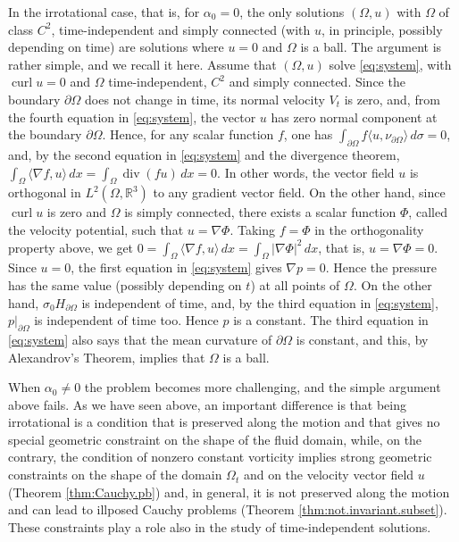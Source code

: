 \documentclass[10pt,reqno,a4paper]{article}
\numberwithin{equation}{section}
\theoremstyle{plain}
\theoremstyle{definition}
\newcommand{\R}{{\mathbb R}}
\newcommand{\Om}{\Omega}
\newcommand{\la}{\langle}
\newcommand{\ra}{\rangle}
\newcommand{\pa}{\partial}
\renewcommand{\div}{\operatorname{div}} %
\newcommand{\grad}{\nabla}
\newcommand{\curl}{\operatorname{curl}}
\begin{document}
In the irrotational case, that is, for $\alpha_0=0$, %
the only solutions $(\Om, u)$ with $\Omega$ of class $C^2$, time-independent and simply connected
(with $u$, in principle, possibly depending on time) 
are solutions where 
$u = 0$ and $\Om$ is a ball. 
The argument is rather simple, and we recall it here.
Assume that $(\Om,u)$ solve \eqref{eq:system}, with $\curl u = 0$ 
and $\Om$ time-independent, $C^2$ and simply connected.
Since the boundary $\pa \Om$ does not change in time, 
its normal velocity $V_t$ is zero, and, from the fourth equation in \eqref{eq:system}, 
the vector $u$ has zero normal component at the boundary $\pa \Om$. 
Hence, for any scalar function $f$, one has 
$\int_{\pa \Om} f \la u , \nu_{\pa \Om} \ra \, d\sigma = 0$, 
and, by the second equation in \eqref{eq:system} and the divergence theorem, 
$\int_\Om \la \grad f, u \ra \, dx = \int_\Om \div(fu) \, dx = 0$. 
In other words, the vector field $u$ is orthogonal in $L^2(\Om, \R^3)$ 
to any gradient vector field. 
On the other hand, since $\curl u$ is zero and $\Om$ is simply connected, 
there exists a scalar function $\Phi$, called the velocity potential, 
such that $u = \grad \Phi$. Taking $f = \Phi$ in the orthogonality property above, 
we get $0 = \int_\Om \la \grad f, u \ra \, dx = \int_\Om |\grad \Phi|^2 \, dx$, 
that is, $u = \grad \Phi = 0$. 
Since $u=0$, the first equation in \eqref{eq:system} gives $\grad p = 0$. 
Hence the pressure has the same value (possibly depending on $t$) at all points of $\Om$. 
On the other hand, $\sigma_0 H_{\pa \Om}$ is independent of time, 
and, by the third equation in \eqref{eq:system}, $p|_{\pa \Om}$ 
is independent of time too. Hence $p$ is a constant. %
The third equation in \eqref{eq:system} also says that the mean curvature of $\pa \Om$ 
is constant, and this, by Alexandrov's Theorem, implies that $\Om$ is a ball.  

When $\alpha_0\not =0$ the problem becomes more challenging, 
and the simple argument above fails. 
As we have seen above, an important difference is that 
being irrotational is a condition that is preserved along the motion 
and that gives no special geometric constraint on the shape of the fluid domain,  
while, on the contrary, the condition of nonzero constant vorticity 
implies strong geometric constraints on the shape of the domain $\Om_t$ 
and on the velocity vector field $u$ (Theorem \ref{thm:Cauchy.pb}) 
and, in general, it is not preserved along the motion  
and can lead to illposed Cauchy problems (Theorem \ref{thm:not.invariant.subset}).
These constraints play a role also in the study of time-independent solutions. 
\end{document}
